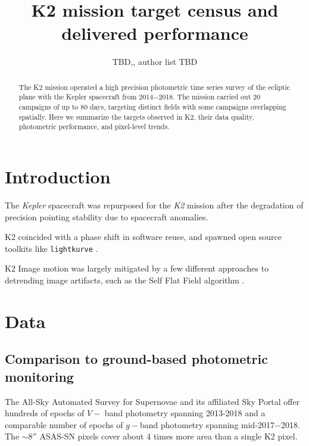 \documentclass[twocolumn]{emulateapj}%
\begin{document}
\title{K2 mission target census and delivered performance}

\author{TBD,, author list TBD}


\begin{abstract}

The K2 mission operated a high precision photometric time series survey of the ecliptic plane with the Kepler spacecraft from 2014$-$2018.  The mission carried out 20 campaigns of up to 80 days, targeting distinct fields with some campaigns overlapping spatially.  Here we summarize the targets observed in K2, their data quality, photometric performance, and pixel-level trends.

\end{abstract}


\maketitle

\section{Introduction}\label{sec:intro}

The \emph{Kepler} spacecraft was repurposed for the \emph{K2} mission \citep{howell14} after the degradation of precision pointing stability due to spacecraft anomalies.

K2 coincided with a phase shift in software reuse, and spawned open source toolkits like \texttt{lightkurve} \citep{geert_barentsen_2019_2565212}.

K2 Image motion was largely mitigated by a few different approaches to detrending image artifacts, such as the Self Flat Field algorithm \citep{vanderburg14}.

\section{Data}
\subsection{Comparison to ground-based photometric monitoring}
The All-Sky Automated Survey for Supernovae \citep[ASAS-SN][]{shappee14} and its affiliated Sky Portal \citep{2017PASP..129j4502K} offer hundreds of epochs of $V-$ band photometry spanning 2013-2018 and a comparable number of epochs of $g-$band photometry spanning mid-2017$-$2018.  The $\sim8''$ ASAS-SN pixels cover about 4 times more area than a single K2 pixel.
\end{document}
